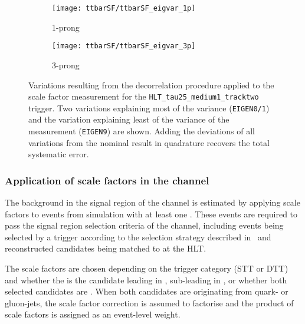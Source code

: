 \begin{figure}[htbp]
  \centering

  \begin{subfigure}[t]{.495\textwidth}
    \texttt{[image: ttbarSF/ttbarSF\_eigvar\_1p]}
    \caption{1-prong \tauhadvis}
    \label{fig:ttbarSF_eigenvariations_1p}
  \end{subfigure}\hfill%
  \begin{subfigure}[t]{.495\textwidth}
    \texttt{[image: ttbarSF/ttbarSF\_eigvar\_3p]}
    \caption{3-prong \tauhadvis}
    \label{fig:ttbarSF_eigenvariations_3p}
  \end{subfigure}

  \caption{Variations resulting from the decorrelation procedure
    applied to the \faketauhadvis scale factor measurement for the
    \texttt{HLT\_tau25\_medium1\_tracktwo} trigger. Two variations
    explaining most of the variance (\texttt{EIGEN0/1}) and the
    variation explaining least of the variance of the measurement
    (\texttt{EIGEN9}) are shown. Adding the deviations of all
    variations from the nominal result in quadrature recovers the
    total systematic error.}%
  \label{fig:ttbarSF_eigenvariations}
\end{figure}


\subsubsection{Application of \faketauhadvis scale factors in the
  \hadhad channel}

The \ttbarFakes background in the signal region of the \hadhad channel
is estimated by applying \faketauhadvis scale factors to \ttbar events
from simulation with at least one \faketauhadvis. These events are
required to pass the signal region selection criteria of the \hadhad
channel, including events being selected by a trigger according to the
selection strategy described in~ and reconstructed
\tauhadvis candidates being matched to \tauhadvis at the HLT.

The scale factors are chosen depending on the trigger category (STT or
DTT) and whether the \faketauhadvis is the \tauhadvis candidate
leading in \pT, sub-leading in \pT, or whether both selected
candidates are \faketauhadvis. When both \tauhadvis candidates are
originating from quark- or gluon-jets, the scale factor correction is
assumed to factorise and the product of scale factors is assigned as
an event-level weight.

